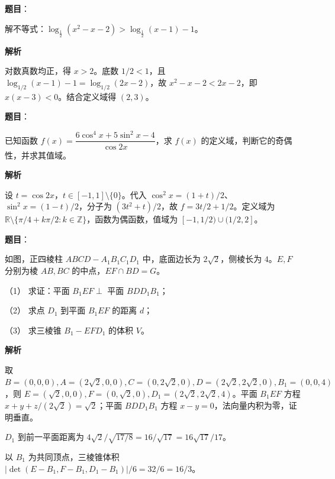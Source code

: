 \begin{answer}

\textbf{题目}：

解不等式：$\log_{\frac12}(x^2-x-2)>\log_{\frac12}(x-1)-1$。

\textbf{解析}

对数真数均正，得 $x>2$。底数 $1/2<1$，且 $\log_{1/2}(x-1)-1=\log_{1/2}(2x-2)$，故 $x^2-x-2<2x-2$，即 $x(x-3)<0$。结合定义域得 $(2,3)$。


\end{answer}
\begin{answer}

\textbf{题目}：

已知函数 $f(x)=\dfrac{6\cos^4x+5\sin^2x-4}{\cos2x}$，求 $f(x)$ 的定义域，判断它的奇偶性，并求其值域。

\textbf{解析}

设 $t=\cos2x$，$t\in[-1,1]\setminus\{0\}$。代入 $\cos^2x=(1+t)/2$、$\sin^2x=(1-t)/2$，分子为 $(3t^2+t)/2$，故 $f=3t/2+1/2$。定义域为 $\mathbb R\setminus\{\pi/4+k\pi/2:k\in\mathbb Z\}$，函数为偶函数，值域为 $[-1,1/2)\cup(1/2,2]$。


\end{answer}
\begin{answer}

\textbf{题目}：

如图，正四棱柱 $ABCD-A_1B_1C_1D_1$ 中，底面边长为 $2\sqrt2$，侧棱长为 $4$。$E,F$ 分别为棱 $AB,BC$ 的中点，$EF\cap BD=G$。

（1） 求证：平面 $B_1EF\perp$ 平面 $BDD_1B_1$；

（2） 求点 $D_1$ 到平面 $B_1EF$ 的距离 $d$；

（3） 求三棱锥 $B_1-EFD_1$ 的体积 $V$。
\nopagebreak[4]
\begin{center}\end{center}
\nopagebreak[4]
\textbf{解析}


取 $B=(0,0,0),A=(2\sqrt2,0,0),C=(0,2\sqrt2,0),D=(2\sqrt2,2\sqrt2,0),B_1=(0,0,4)$，则 $E=(\sqrt2,0,0),F=(0,\sqrt2,0),D_1=(2\sqrt2,2\sqrt2,4)$。平面 $B_1EF$ 方程 $x+y+z/(2\sqrt2)=\sqrt2$；平面 $BDD_1B_1$ 方程 $x-y=0$，法向量内积为零，证明垂直。


$D_1$ 到前一平面距离为 $4\sqrt2/\sqrt{17/8}=16/\sqrt{17}=16\sqrt{17}/17$。


以 $B_1$ 为共同顶点，三棱锥体积 $|\det(E-B_1,F-B_1,D_1-B_1)|/6=32/6=16/3$。




\end{answer}
